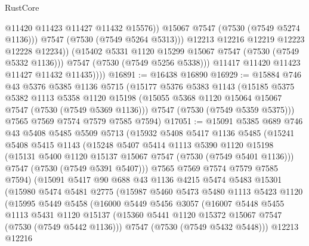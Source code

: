 \begin{lexlean}{RustCore}
\begin{coremodule}
                          @11420
                          @11423
                          @11427
                          @11432
                          @15576))
                      @15067
                      @7547
                      (@7530 (@7549 @5274 @1136)))
                    @7547
                    (@7530 (@7549 @5264 @5313)))
                  @12213
                  @12216
                  @12219
                  @12223
                  @12228
                  @12234))
              (@15402 @5331 @1120 @15299 @15067 @7547 (@7530 (@7549 @5332 @1136)))
              @7547
              (@7530 (@7549 @5256 @5338)))
            @11417
            @11420
            @11423
            @11427
            @11432
            @11435))))
@16891 := @16438 @16890
@16929 := @15884
    @746
    @43
    @5376
    @5385
    @1136
    @5715
    (@15177
      @5376
      @5383
      @1143
      (@15185
        @5375
        @5382
        @1113
        @5358
        @1120
        @15198
        (@15055 @5368 @1120 @15064 @15067 @7547 (@7530 (@7549 @5369 @1136)))
        @7547
        (@7530 (@7549 @5359 @5375)))
      @7565
      @7569
      @7574
      @7579
      @7585
      @7594)
@17051 := @15091
    @5385
    @689
    @746
    @43
    @5408
    @5485
    @5509
    @5713
    (@15932
      @5408
      @5417
      @1136
      @5485
      (@15241
        @5408
        @5415
        @1143
        (@15248
          @5407
          @5414
          @1113
          @5390
          @1120
          @15198
          (@15131 @5400 @1120 @15137 @15067 @7547 (@7530 (@7549 @5401 @1136)))
          @7547
          (@7530 (@7549 @5391 @5407)))
        @7565
        @7569
        @7574
        @7579
        @7585
        @7594)
      (@15091
        @5417
        @90
        @688
        @43
        @1136
        @4215
        @5474
        @5483
        @15301
        (@15980
          @5474
          @5481
          @2775
          (@15987
            @5460
            @5473
            @5480
            @1113
            @5423
            @1120
            (@15995
              @5449
              @5458
              (@16000
                @5449
                @5456
                @3057
                (@16007
                  @5448
                  @5455
                  @1113
                  @5431
                  @1120
                  @15137
                  (@15360 @5441 @1120 @15372 @15067 @7547 (@7530 (@7549 @5442 @1136)))
                  @7547
                  (@7530 (@7549 @5432 @5448)))
                @12213
                @12216

\end{coremodule}
\end{lexlean}
